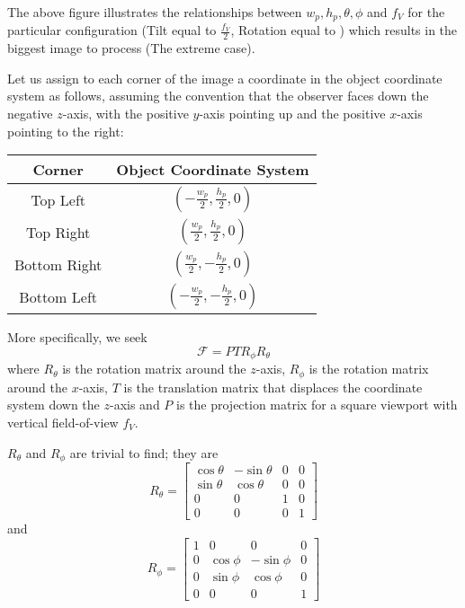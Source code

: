 \documentclass[onecolumn]{article} %
\newcommand{\lp}{\left(}%
\newcommand{\rp}{\right)}%
\begin{document}
The above figure illustrates the relationships between $w_{p}, h_{p}, \theta, \phi$ and $f_{V}$ for the particular configuration (Tilt equal to $\frac{f_{V}}{2}$, Rotation equal to \smash{$\arctan\lp\frac{w_{p}}{h_{p}}\rp$}) which results in the biggest image to process (The extreme case).

Let us assign to each corner of the image a coordinate in the object coordinate system as follows, assuming the convention that the observer faces down the negative $z$-axis, with the positive $y$-axis pointing up and the positive $x$-axis pointing to the right:

\begin{center}
\begin{tabular}{|c|c|}
	\hline
	\textbf{Corner} & \textbf{Object Coordinate System} \\\hline
	Top Left          & $\lp-\frac{w_{p}}{2},\frac{h_{p}}{2},0\rp$ \\\hline
	Top Right       & $\lp\frac{w_{p}}{2},\frac{h_{p}}{2},0\rp$ \\\hline
	Bottom Right & $\lp\frac{w_{p}}{2},-\frac{h_{p}}{2},0\rp$ \\\hline
	Bottom Left    & $\lp-\frac{w_{p}}{2},-\frac{h_{p}}{2},0\rp$ \\\hline
\end{tabular}
\end{center}

More specifically, we seek
\[ \boxed{\mathcal{F}=PTR_{\phi}R_{\theta}} \]
where $R_{\theta}$ is the rotation matrix around the $z$-axis, $R_{\phi}$ is the rotation matrix around the $x$-axis, $T$ is the translation matrix that displaces the coordinate system down the $z$-axis and $P$ is the projection matrix for a square viewport with vertical field-of-view $f_{V}$.\\\vspace{12pt}

$R_{\theta}$ and $R_{\phi}$ are trivial to find; they are
\[ R_{\theta} = \left[\begin{array}{cccc} \cos\theta & -\sin\theta & 0 & 0 \\ \sin\theta & \cos\theta & 0 & 0 \\0 & 0 & 1 & 0 \\0 & 0 & 0 & 1\end{array}\right] \]
and
\[ R_{\phi} = \left[\begin{array}{cccc} 1 & 0 & 0 & 0 \\ 0 & \cos\phi & -\sin\phi & 0 \\0 & \sin\phi & \cos\phi & 0 \\0 & 0 & 0 & 1\end{array}\right] \]
\end{document}
